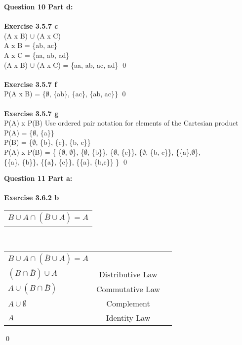 \documentclass[11pt]{article}
\begin{document}
\newpage

\noindent \textbf{Question 10 Part d:}\\\\	
\textbf{Exercise 3.5.7 c }\\
(A x B) $\cup$ (A x C)\\
A x B = \{ab, ac\}\\
A x C = \{aa, ab, ad\}\\
(A x B) $\cup$ (A x C) = \{aa, ab, ac, ad\} \qed \\\\
\textbf{Exercise 3.5.7 f }\\
P(A x B) = \{$\emptyset$, \{ab\}, \{ac\}, \{ab, ac\}\} \qed\\\\
\textbf{Exercise 3.5.7 g }\\
P(A) x P(B) Use ordered pair notation for elements of the Cartesian product\\
P(A) = \{$\emptyset$, \{a\}\}\\
P(B) = \{$\emptyset$, \{b\}, \{c\}, \{b, c\}\} \\
P(A) x P(B) = \{ \{$\emptyset$, $\emptyset$\}, \{$\emptyset$, \{b\}\}, \{$\emptyset$, \{c\}\}, \{$\emptyset$, \{b, c\}\}, \{\{a\},$\emptyset$\},\\ \{\{a\}, \{b\}\}, \{\{a\}, \{c\}\}, \{\{a\}, \{b,c\}\} \} \qed


\newpage

\noindent \textbf{Question 11 Part a:}\\\\	
\textbf{Exercise 3.6.2 b }\\
\begin{center}
  \begin{tabular}{l}
    $B \cup A \cap (\overline{B} \cup A) = A$\\
  
  \end{tabular} \\
 \begin{center}
  \begin{tabular}{lcl}
$B \cup A \cap (\overline{B} \cup A) = A$ & \\
$(B \cap \overline{B}) \cup A$ & Distributive Law\\
$A \cup (B \cap \overline{B})$ & Commutative Law\\
$A \cup  \emptyset $ & Complement\\
$A$ &Identity Law\\ 

  \end{tabular}
\end{center}
\end{center}
\qed 
\end{document}
